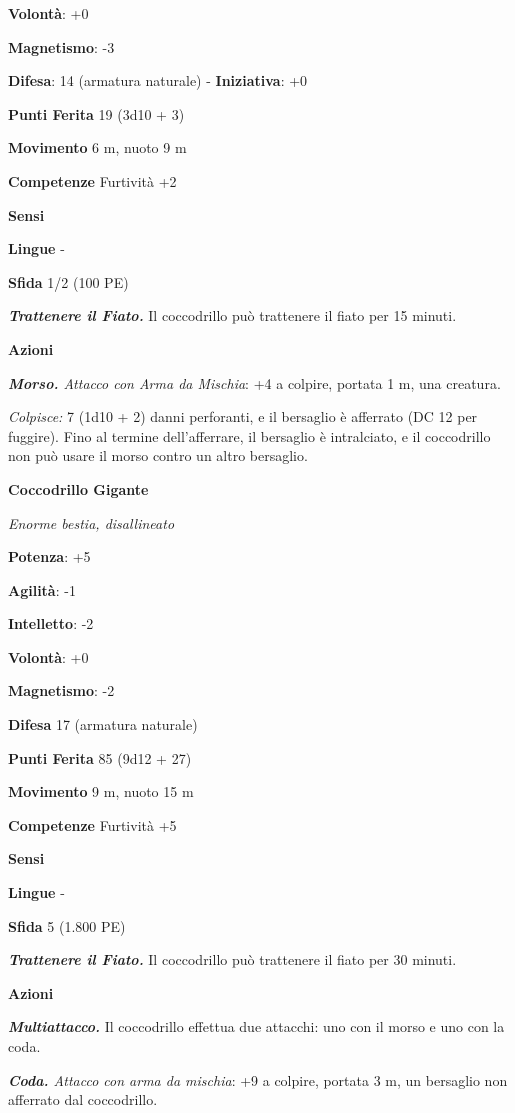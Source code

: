 \begin{multicols}{2}
\textbf{Volontà}: +0

\textbf{Magnetismo}: -3

\textbf{Difesa}: 14 (armatura naturale) - \textbf{Iniziativa}: +0

\textbf{Punti Ferita} 19 (3d10 + 3)

\textbf{Movimento} 6 m, nuoto 9 m

\textbf{Competenze} Furtività +2

\textbf{Sensi} 

\textbf{Lingue} -

\textbf{Sfida} 1/2 (100 PE)\smallskip

\emph{\textbf{Trattenere il Fiato.}} Il coccodrillo può trattenere il
fiato per 15 minuti.

\smallskip\textbf{Azioni}

\emph{\textbf{Morso.} Attacco con Arma da Mischia}: +4 a colpire,
portata 1 m, una creatura.

\emph{Colpisce:} 7 (1d10 + 2) danni perforanti, e il bersaglio è
afferrato (DC 12 per fuggire). Fino al termine dell'afferrare, il
bersaglio è intralciato, e il coccodrillo non può usare il morso contro
un altro bersaglio.

\textbf{Coccodrillo Gigante}

\emph{Enorme bestia, disallineato}

\textbf{Potenza}: +5

\textbf{Agilità}: -1

\textbf{Intelletto}: -2

\textbf{Volontà}: +0

\textbf{Magnetismo}: -2

\textbf{Difesa} 17 (armatura naturale)

\textbf{Punti Ferita} 85 (9d12 + 27)

\textbf{Movimento} 9 m, nuoto 15 m

\textbf{Competenze} Furtività +5

\textbf{Sensi} 

\textbf{Lingue} -

\textbf{Sfida} 5 (1.800 PE)\smallskip

\emph{\textbf{Trattenere il Fiato.}} Il coccodrillo può trattenere il
fiato per 30 minuti.

\smallskip\textbf{Azioni}

\emph{\textbf{Multiattacco.}} Il coccodrillo effettua due attacchi: uno
con il morso e uno con la coda.

\emph{\textbf{Coda.} Attacco con arma da mischia}: +9 a colpire, portata
3 m, un bersaglio non afferrato dal coccodrillo.


\end{multicols}
